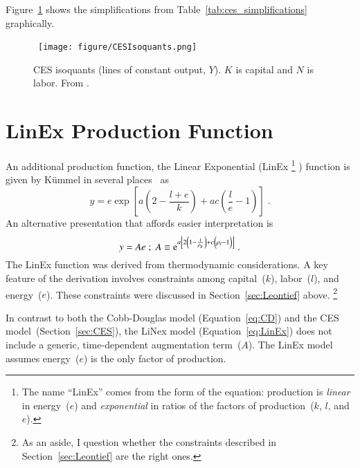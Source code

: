 \documentclass[preprint,authoryear,12pt]{elsarticle}
\begin{document}
Figure~\ref{fig:CES_isoquants} shows the simplifications from Table~\ref{tab:ces_simplifications}
graphically.
%
\begin{figure}[!ht]
\centering\
\texttt{[image: figure/CESIsoquants.png]}
\caption[CES isoquants]{CES isoquants (lines of constant output, $Y$). 
$K$ is capital and $N$ is labor. From \citet{Klump:2011aa}.}
\label{fig:CES_isoquants}
\end{figure}


\section{LinEx Production Function} 
\label{sec:linex}

An additional production function, the Linear Exponential (LinEx%
    \footnote{
    The name ``LinEx'' comes from the form of the equation:
    production is \emph{linear} in energy~($e$) and \emph{exponential}
    in ratios of the factors of production~($k$, $l$, and $e$).
    }%
) function is given by K\"{u}mmel in several places~\citep{Kummel:1980wx,Kummel:1982vy,
Kummel:1985vz,Kummel:1989tf,Kummel:2002tx,Kummel:2010vz} as
%
\begin{equation} \label{eq:LinEx-kummel}
  y = e \exp{\left[ a \left( 2 - \frac{l + e}{k} \right)  + a c \left( \frac{l}{e} - 1 \right)\right]} \; .
\end{equation}
%
An alternative presentation that affords easier interpretation is
%
\begin{equation} \label{eq:LinEx}
  y = A e \; ; \; A \equiv \mathrm{e}^{a\left[2 \left(1 - \frac{1}{\rho_k} \right) 
    + c \left(\vphantom{\frac{1}{\rho_k}}\rho_l - 1 \right)\right]} \; .
\end{equation}
%
The LinEx function was derived from thermodynamic considerations. 
A key feature of the derivation involves
constraints among capital~($k$), labor~($l$), and energy~($e$).
These constraints were discussed in Section~\ref{sec:Leontief} above.%
  \footnote{
  As an aside, I question whether the constraints 
  described in Section~\ref{sec:Leontief} are the right ones.
  }%

In contrast to both the Cobb-Douglas model (Equation~\ref{eq:CD}) 
and the CES model~(Section~\ref{sec:CES}), 
the LiNex model (Equation~\ref{eq:LinEx}) does not include a generic, 
time-dependent augmentation term~($A$).
The LinEx model assumes energy~($e$) is the only factor of production.
\end{document}
